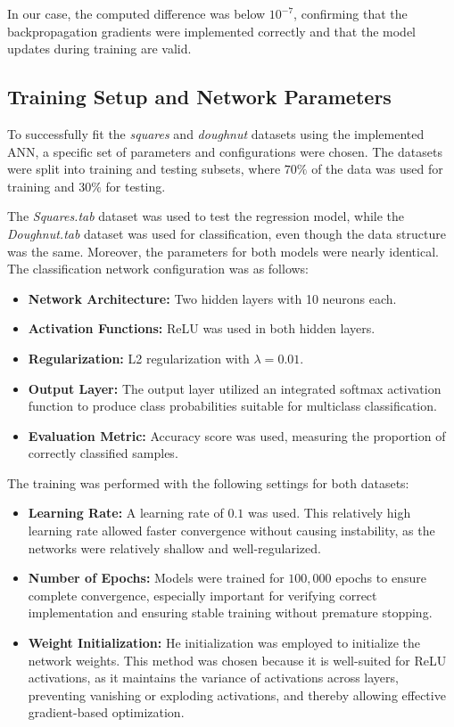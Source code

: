 \documentclass[fleqn,moreauthors,10pt]{ds_report}
\begin{document}
In our case, the computed difference was below \(10^{-7}\), confirming that the backpropagation gradients were implemented correctly and that the model updates during training are valid.

\subsection{Training Setup and Network Parameters}
To successfully fit the \textit{squares} and \textit{doughnut} datasets using the implemented ANN, a specific set of parameters and configurations were chosen. The datasets were split into training and testing subsets, where \(70\%\) of the data was used for training and \(30\%\) for testing.

The \textit{Squares.tab} dataset was used to test the regression model, while the \textit{Doughnut.tab} dataset was used for classification, even though the data structure was the same. Moreover, the parameters for both models were nearly identical. The classification network configuration was as follows:
\begin{itemize}
    \item \textbf{Network Architecture:} Two hidden layers with 10 neurons each.
    \item \textbf{Activation Functions:} ReLU was used in both hidden layers.
    \item \textbf{Regularization:} L2 regularization with \(\lambda = 0.01\).
    \item \textbf{Output Layer:} The output layer utilized an integrated softmax activation function to produce class probabilities suitable for multiclass classification.
    \item \textbf{Evaluation Metric:} Accuracy score was used, measuring the proportion of correctly classified samples.
\end{itemize}
The training was performed with the following settings for both datasets:
\begin{itemize}
    \item \textbf{Learning Rate:} A learning rate of \(0.1\) was used. This relatively high learning rate allowed faster convergence without causing instability, as the networks were relatively shallow and well-regularized.
    \item \textbf{Number of Epochs:} Models were trained for \(100,000\) epochs to ensure complete convergence, especially important for verifying correct implementation and ensuring stable training without premature stopping.
    \item \textbf{Weight Initialization:} He initialization was employed to initialize the network weights. This method was chosen because it is well-suited for ReLU activations, as it maintains the variance of activations across layers, preventing vanishing or exploding activations, and thereby allowing effective gradient-based optimization.
\end{itemize}
\end{document}
